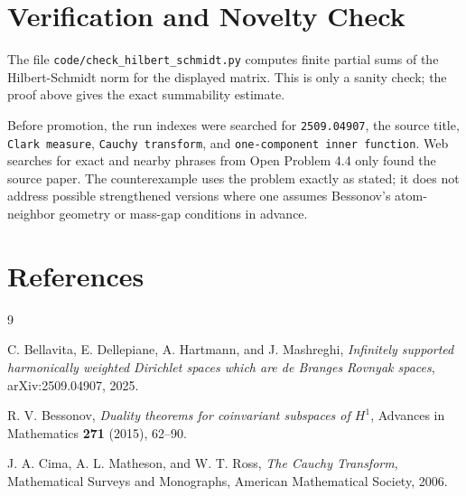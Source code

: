 \documentclass[11pt]{article}
\begin{document}
\section*{Verification and Novelty Check}

The file \texttt{code/check\_hilbert\_schmidt.py} computes finite partial
sums of the Hilbert-Schmidt norm for the displayed matrix. This is only a
sanity check; the proof above gives the exact summability estimate.

Before promotion, the run indexes were searched for \texttt{2509.04907},
the source title, \texttt{Clark measure}, \texttt{Cauchy transform}, and
\texttt{one-component inner function}. Web searches for exact and nearby
phrases from Open Problem 4.4 only found the source paper. The counterexample
uses the problem exactly as stated; it does not address possible strengthened
versions where one assumes Bessonov's atom-neighbor geometry or mass-gap
conditions in advance.

\section*{References}

\begin{thebibliography}{9}

C. Bellavita, E. Dellepiane, A. Hartmann, and J. Mashreghi,
\emph{Infinitely supported harmonically weighted Dirichlet spaces which are
de Branges Rovnyak spaces}, arXiv:2509.04907, 2025.

R. V. Bessonov,
\emph{Duality theorems for coinvariant subspaces of $H^1$},
Advances in Mathematics \textbf{271} (2015), 62--90.

J. A. Cima, A. L. Matheson, and W. T. Ross,
\emph{The Cauchy Transform},
Mathematical Surveys and Monographs, American Mathematical Society, 2006.

\end{thebibliography}
\end{document}
